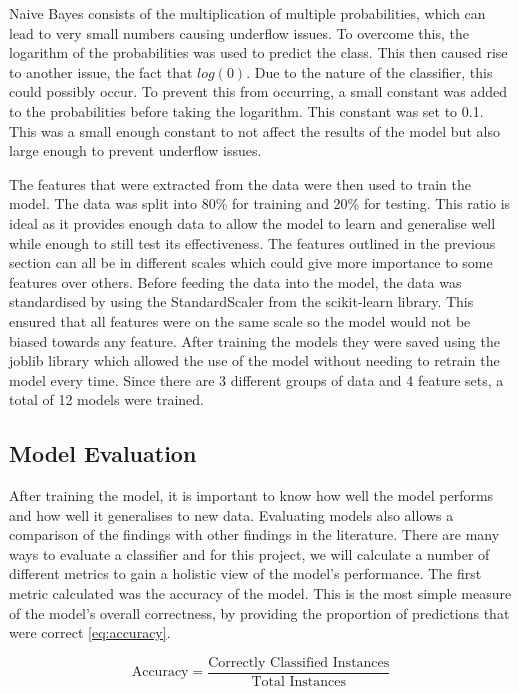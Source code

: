 Naive Bayes consists of the multiplication of multiple probabilities, which can lead to very small numbers causing underflow issues. To overcome this, the logarithm of the probabilities was used to predict the class. This then caused rise to another issue, the fact that $log(0)$. Due to the nature of the classifier, this could possibly occur. To prevent this from occurring, a small constant was added to the probabilities before taking the logarithm. This constant was set to 0.1. This was a small enough constant to not affect the results of the model but also large enough to prevent underflow issues.

The features that were extracted from the data were then used to train the model. The data was split into 80\% for training and 20\% for testing. This ratio is ideal as it provides enough data to allow the model to learn and generalise well while enough to still test its effectiveness. The features outlined in the previous section can all be in different scales which could give more importance to some features over others. Before feeding the data into the model, the data was standardised by using the StandardScaler from the scikit-learn library.  This ensured that all features were on the same scale so the model would not be biased towards any feature. After training the models they were saved using the joblib library which allowed the use of the model without needing to retrain the model every time. Since there are 3 different groups of data and 4 feature sets, a total of 12 models were trained. 

\subsection {Model Evaluation}

After training the model, it is important to know how well the model performs and how well it generalises to new data. Evaluating models also allows a comparison of the findings with other findings in the literature. There are many ways to evaluate a classifier and for this project, we will calculate a number of different metrics to gain a holistic view of the model's performance. The first metric calculated was the accuracy of the model. This is the most simple measure of the model's overall correctness, by providing the proportion of predictions that were correct \ref{eq:accuracy}.


\begin{equation}
    \label{eq:accuracy}
    \text{Accuracy} = \frac{\text{Correctly Classified Instances}}{\text{Total Instances}}
\end{equation}


